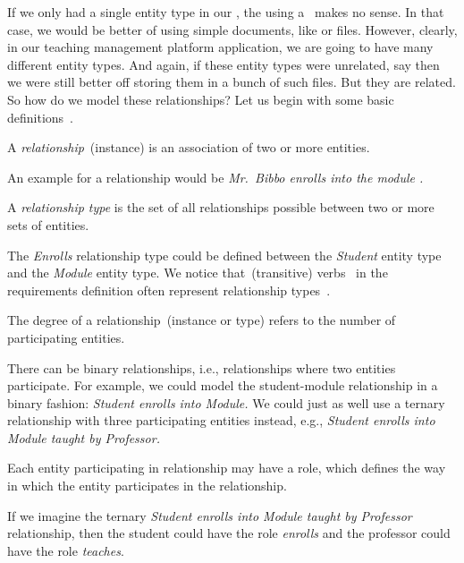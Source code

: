 %
%
\label{sec:conceptual:relationships}%
%
If we only had a single entity type in our \db, the using a \db\ makes no sense.
In that case, we would be better of using simple documents, like  or  files.
However, clearly, in our teaching management platform application, we are going to have many different entity types.
And again, if these entity types were unrelated, say    then we were still better off storing them in a bunch of such files.
But they are related.
So how do we model these relationships?
Let us begin with some basic definitions~\cite{G2011EW2ITDS:CMUTERM}.%
%
\begin{definition}[Relationship]%
A \emph{relationship}~(instance) is an association of two or more entities.%
\end{definition}%
%
An example for a relationship would be \emph{Mr.~Bibbo enrolls into the module .}
%
\begin{definition}%
A \emph{relationship type} is the set of all relationships possible between two or more sets of entities.%
\end{definition}%
%
The \emph{Enrolls} relationship type could be defined between the \emph{Student} entity type and the \emph{Module} entity type.
We notice that~(transitive) verbs~\cite{EOWM2025MWAMTD:TA} in the requirements definition often represent relationship types~\cite{C1997ECAED}.%
%
\begin{definition}%
\label{def:degreeOfRelationship}%
The degree of a relationship~(instance or type) refers to the number of participating entities.%
\end{definition}%
%
There can be binary relationships, i.e., relationships where two entities participate.
For example, we could model the student-module relationship in a binary fashion: \emph{Student enrolls into Module.}
We could just as well use a ternary relationship with three participating entities instead, e.g., \emph{Student enrolls into Module taught by Professor.}
%
\begin{definition}%
Each entity participating in relationship may have a role, which defines the way in which the entity participates in the relationship.%
\end{definition}%
%
If we imagine the ternary \emph{Student enrolls into Module taught by Professor} relationship, then the student could have the role \emph{enrolls} and the professor could have the role \emph{teaches}.%
